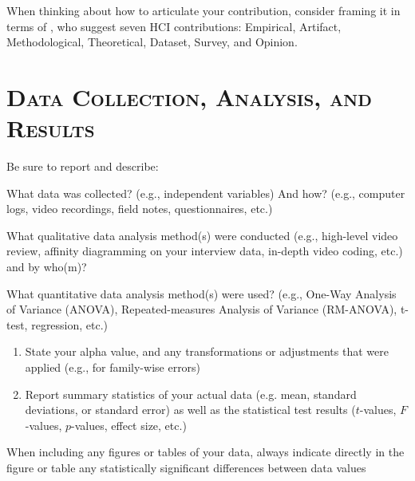 When thinking about how to articulate your contribution, consider framing it in terms of \citet{wobbrock2016research}, who suggest seven HCI contributions: Empirical, Artifact, Methodological, Theoretical, Dataset, Survey, and Opinion.

	

\noindent\makebox[\linewidth]{\rule{\linewidth}{0.4pt}}
\section*{\textsc{Data Collection, Analysis, and Results}}

Be sure to report and describe: 
\begin{checklist}
	\item What data was collected? (e.g., independent variables) And how? (e.g., computer logs, video recordings, field notes, questionnaires, etc.) 

	\item What qualitative data analysis method(s) were conducted (e.g., high-level video review, affinity diagramming on your interview data, in-depth video coding, etc.) and by who(m)?
	
	\item What quantitative data analysis method(s) were used? (e.g., One-Way Analysis of Variance (ANOVA), Repeated-measures Analysis of Variance (RM-ANOVA), t-test, regression, etc.) 	
	
	\begin{enumerate}
 		\item State your alpha value, and any transformations or adjustments that were applied (e.g., for family-wise errors)
		\item Report summary statistics of your actual data (e.g. mean, standard deviations, or standard error) as well as the statistical test results ($t$-values, $F$-values, $p$-values, effect size, etc.)
	\end{enumerate}
	\item When including any figures or tables of your data, always indicate directly in the figure or table any statistically significant differences between data values
\end{checklist}


\noindent\makebox[\linewidth]{\rule{\linewidth}{0.4pt}}

